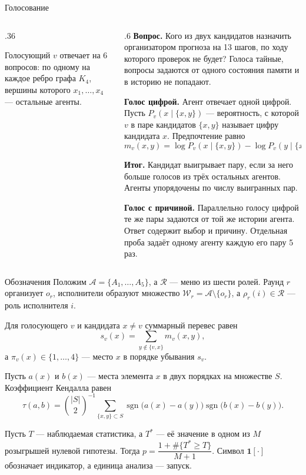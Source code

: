 \documentclass[aspectratio=169,11pt]{beamer}
\DeclareMathOperator{\sgn}{sgn}
\newcommand{\ind}{\mathbf 1}
\begin{document}
\begin{frame}{Голосование}
\begin{columns}[T]
\begin{column}{.36\textwidth}
\centering
{}

\medskip
\footnotesize Голосующий $v$ отвечает на 6 вопросов: по одному на каждое ребро графа $K_4$, вершины которого $x_1,\dots,x_4$ --- остальные агенты.
\end{column}
\begin{column}{.6\textwidth}
\footnotesize
\textbf{Вопрос.} Кого из двух кандидатов назначить организатором прогноза на 13 шагов, по ходу которого проверок не будет? Голоса тайные, вопросы задаются от одного состояния памяти и в историю не попадают.

\medskip
\textbf{Голос цифрой.} Агент отвечает одной цифрой. Пусть $P_v(x\mid\{x,y\})$ --- вероятность, с которой $v$ в паре кандидатов $\{x,y\}$ называет цифру кандидата $x$. Предпочтение равно
\[m_v(x,y)=\log P_v(x\mid\{x,y\})-\log P_v(y\mid\{x,y\}).\]

\textbf{Итог.} Кандидат выигрывает пару, если за него больше голосов из трёх остальных агентов. Агенты упорядочены по числу выигранных пар.

\medskip
\textbf{Голос с причиной.} Параллельно голосу цифрой те же пары задаются от той же истории агента. Ответ содержит выбор и причину. Отдельная проба задаёт одному агенту каждую его пару 5 раз.
\end{column}
\end{columns}
\end{frame}

\begin{frame}{Обозначения}
\small
Положим $\mathcal A=\{A_1,\dots,A_5\}$, а $\mathcal R$ --- меню из шести ролей. Раунд $r$ организует $o_r$, исполнители образуют множество $\mathcal W_r=\mathcal A\setminus\{o_r\}$, а $\rho_r(i)\in\mathcal R$ --- роль исполнителя $i$.

\medskip
Для голосующего $v$ и кандидата $x\ne v$ суммарный перевес равен
\[s_v(x)=\sum_{y\notin\{v,x\}}m_v(x,y),\]
а $\pi_v(x)\in\{1,\dots,4\}$ --- место $x$ в порядке убывания $s_v$.

\medskip
Пусть $a(x)$ и $b(x)$ --- места элемента $x$ в двух порядках на множестве $S$. Коэффициент Кендалла равен
\[\tau(a,b)=\binom{\lvert S\rvert}{2}^{-1}\sum_{\{x,y\}\subset S}\sgn\bigl(a(x)-a(y)\bigr)\sgn\bigl(b(x)-b(y)\bigr).\]

Пусть $T$ --- наблюдаемая статистика, а $T^\ast$ --- её значение в одном из $M$ розыгрышей нулевой гипотезы. Тогда $p=\dfrac{1+\#\{T^\ast\ge T\}}{M+1}$. Символ $\ind[\cdot]$ обозначает индикатор, а единица анализа --- запуск.
\end{frame}
\end{document}
